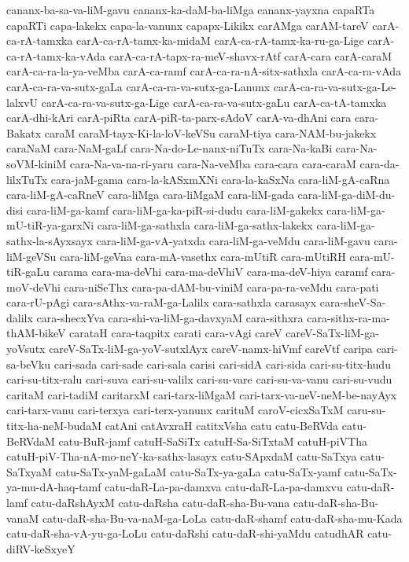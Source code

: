 {cananx-ba-sa-va-liM-gavu
cananx-ka-daM-ba-liMga
cananx-yayxna
capaRTa
capaRTi
capa-lakekx
capa-la-vanunx
capapx-Likikx
carAMga
carAM-tareV
carA-ca-rA-tamxka
carA-ca-rA-tamx-ka-midaM
carA-ca-rA-tamx-ka-ru-ga-Lige
carA-ca-rA-tamx-ka-vAda
carA-ca-rA-tapx-ra-meV-shavx-rAtf
carA-cara
carA-caraM
carA-ca-ra-la-ya-veMba
carA-ca-ramf
carA-ca-ra-nA-sitx-sathxla
carA-ca-ra-vAda
carA-ca-ra-va-sutx-gaLa
carA-ca-ra-va-sutx-ga-Lanunx
carA-ca-ra-va-sutx-ga-Le-lalxvU
carA-ca-ra-va-sutx-ga-Lige
carA-ca-ra-va-sutx-gaLu
carA-ca-tA-tamxka
carA-dhi-kAri
carA-piRta
carA-piR-ta-parx-sAdoV
carA-va-dhAni
cara
cara-Bakatx
caraM
caraM-tayx-Ki-la-loV-keVSu
caraM-tiya
cara-NAM-bu-jakekx
caraNaM
cara-NaM-gaLf
cara-Na-do-Le-nanx-niTuTx
cara-Na-kaBi
cara-Na-soVM-kiniM
cara-Na-va-na-ri-yaru
cara-Na-veMba
cara-cara
cara-caraM
cara-da-lilxTuTx
cara-jaM-gama
cara-la-kASxmXNi
cara-la-kaSxNa
cara-liM-gA-caRna
cara-liM-gA-caRneV
cara-liMga
cara-liMgaM
cara-liM-gada
cara-liM-ga-diM-du-disi
cara-liM-ga-kamf
cara-liM-ga-ka-piR-si-dudu
cara-liM-gakekx
cara-liM-ga-mU-tiR-ya-garxNi
cara-liM-ga-sathxla
cara-liM-ga-sathx-lakekx
cara-liM-ga-sathx-la-sAyxsayx
cara-liM-ga-vA-yatxda
cara-liM-ga-veMdu
cara-liM-gavu
cara-liM-geVSu
cara-liM-geVna
cara-mA-vasethx
cara-mUtiR
cara-mUtiRH
cara-mU-tiR-gaLu
carama
cara-ma-deVhi
cara-ma-deVhiV
cara-ma-deV-hiya
caramf
cara-moV-deVhi
cara-niSeThx
cara-pa-dAM-bu-viniM
cara-pa-ra-veMdu
cara-pati
cara-rU-pAgi
cara-sAthx-va-raM-ga-Lalilx
cara-sathxla
carasayx
cara-sheV-Sa-dalilx
cara-shecxYva
cara-shi-va-liM-ga-davxyaM
cara-sithxra
cara-sithx-ra-ma-thAM-bikeV
carataH
cara-taqpitx
carati
cara-vAgi
careV
careV-SaTx-liM-ga-yoVsutx
careV-SaTx-liM-ga-yoV-sutxlAyx
careV-namx-hiVmf
careVtf
caripa
cari-sa-beVku
cari-sada
cari-sade
cari-sala
carisi
cari-sidA
cari-sida
cari-su-titx-hudu
cari-su-titx-ralu
cari-suva
cari-su-valilx
cari-su-vare
cari-su-va-vanu
cari-su-vudu
caritaM
cari-tadiM
caritarxM
cari-tarx-liMgaM
cari-tarx-va-neV-neM-be-nayAyx
cari-tarx-vanu
cari-terxya
cari-terx-yanunx
carituM
caroV-cicxSaTxM
caru-su-titx-ha-neM-budaM
catAni
catAvxraH
catitxVsha
catu
catu-BeRVda
catu-BeRVdaM
catu-BuR-jamf
catuH-SaSiTx
catuH-Sa-SiTxtaM
catuH-piVTha
catuH-piV-Tha-nA-mo-neY-ka-sathx-lasayx
catu-SApxdaM
catu-SaTxya
catu-SaTxyaM
catu-SaTx-yaM-gaLaM
catu-SaTx-ya-gaLa
catu-SaTx-yamf
catu-SaTx-ya-mu-dA-haq-tamf
catu-daR-La-pa-damxva
catu-daR-La-pa-damxvu
catu-daR-lamf
catu-daRshAyxM
catu-daRsha
catu-daR-sha-Bu-vana
catu-daR-sha-Bu-vanaM
catu-daR-sha-Bu-va-naM-ga-LoLa
catu-daR-shamf
catu-daR-sha-mu-Kada
catu-daR-sha-vA-yu-ga-LoLu
catu-daRshi
catu-daR-shi-yaMdu
catudhAR
catu-diRV-keSxyeY
}
